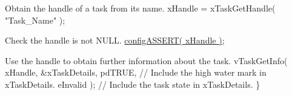 \begin{DoxyPre}Obtain the handle of a task from its name.
    xHandle = xTaskGetHandle( "Task\_Name" );\end{DoxyPre}



\begin{DoxyPre}Check the handle is not NULL.
    \hyperlink{FreeRTOSConfig_8h_a228c70cd48927d6ab730ed1a6dfbe35f}{configASSERT( xHandle )};\end{DoxyPre}



\begin{DoxyPre}Use the handle to obtain further information about the task.
    vTaskGetInfo( xHandle,
                  \&xTaskDetails,
                  pdTRUE, // Include the high water mark in xTaskDetails.
                  eInvalid ); // Include the task state in xTaskDetails.
 \}
   \end{DoxyPre}
 